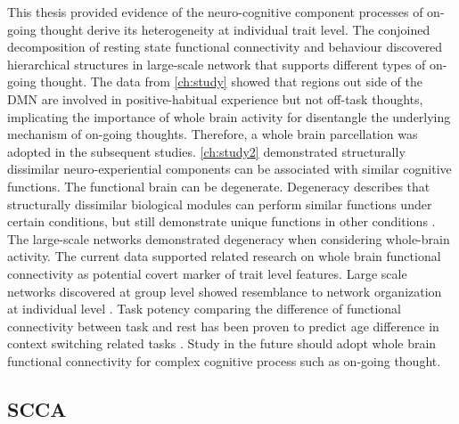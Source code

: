 This thesis provided evidence of the neuro-cognitive component processes of on-going thought derive its heterogeneity at individual trait level. The conjoined decomposition of resting state functional connectivity and behaviour discovered hierarchical structures in large-scale network  that supports different types of on-going thought. The data from \cref{ch:study} showed that regions out side of the DMN are involved in positive-habitual experience but not off-task thoughts, implicating the importance of whole brain activity for disentangle the underlying mechanism of on-going thoughts. Therefore, a whole brain parcellation was adopted in the subsequent studies. \cref{ch:study2} demonstrated structurally dissimilar neuro-experiential components can be associated with similar cognitive functions. The functional brain can be degenerate. Degeneracy describes that structurally dissimilar biological modules can perform similar functions under certain conditions, but still demonstrate unique functions in other conditions \cite{Buckner2013}. The large-scale networks demonstrated degeneracy when considering whole-brain activity. The current data supported related research on whole brain functional connectivity as potential covert marker of trait level features. Large scale networks discovered at group level showed resemblance to network organization at individual level \cite{Finn2015}. Task potency comparing the difference of functional connectivity between task and rest has been proven to predict age difference in context switching related tasks \cite{Chauvin2017}. Study in the future should adopt whole brain functional connectivity for complex cognitive process such as on-going thought.

\subsection{SCCA}
%

